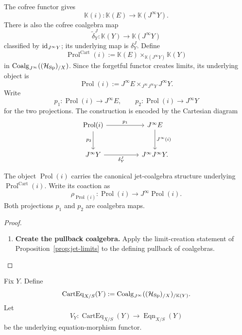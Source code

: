 \begin{construction}
The cofree functor gives
\[
  \mathbb K(i):
  \mathbb K(E)\to\mathbb K(J^\infty Y).
\]
There is also the cofree coalgebra map
\[
  \widetilde\delta^J_Y:
  \mathbb K(Y)\to\mathbb K(J^\infty Y)
\]
classified by \(\operatorname{id}_{J^\infty Y}\); its underlying map is \(\delta^J_Y\). Define
\[
  \operatorname{Prol}^{\mathrm{Cart}}(i)
  :=
  \mathbb K(E)
  \times_{\mathbb K(J^\infty Y)}
  \mathbb K(Y)
\]
in \(\operatorname{Coalg}_{J^\infty}((\mathcal H_{\operatorname{Sp}})_{/X})\). Since the forgetful functor creates
limits, its underlying object is
\[
  \operatorname{Prol}(i)
  :=
  J^\infty E
  \times_{J^\infty J^\infty Y}
  J^\infty Y.
\]
Write
\[
  p_1:\operatorname{Prol}(i)\to J^\infty E,
  \qquad
  p_2:\operatorname{Prol}(i)\to J^\infty Y
\]
for the two projections. The construction is encoded by the Cartesian diagram
\[
\begin{tikzcd}[column sep=huge,row sep=large]
\operatorname{Prol}(i)
  \ar[r,"p_1"]
  \ar[d,"p_2"']
&
J^\infty E \ar[d,"J^\infty(i)"]\\
J^\infty Y
  \ar[r,"\delta^J_Y"']
&
J^\infty J^\infty Y .
\end{tikzcd}
\]
\end{construction}

\begin{theorem}
\label{thm:canonical-prolongation-coalgebra}
The object \(\operatorname{Prol}(i)\) carries the canonical jet-coalgebra structure underlying
\(\operatorname{Prol}^{\mathrm{Cart}}(i)\). Write its coaction as
\[
  \rho_{\operatorname{Prol}(i)}:\operatorname{Prol}(i)\longrightarrow J^\infty \operatorname{Prol}(i).
\]
Both projections \(p_1\) and \(p_2\) are coalgebra maps.
\end{theorem}

\begin{proof}
\leavevmode
\begin{enumerate}[label=\textup{(\arabic*)}]
    \item \textbf{Create the pullback coalgebra.}
Apply the limit-creation statement of Proposition~\ref{prop:jet-limits} to the
defining pullback of coalgebras.
\end{enumerate}
\end{proof}

Fix \(Y\). Define
\[
  \operatorname{CartEq}_{X/S}(Y)
  :=
  \operatorname{Coalg}_{J^\infty}((\mathcal H_{\operatorname{Sp}})_{/X})_{/\mathbb K(Y)}.
\]
Let
\[
  V_Y:
  \operatorname{CartEq}_{X/S}(Y)
  \longrightarrow
  \operatorname{Eqn}_{X/S}(Y)
\]
be the underlying equation-morphism functor.

